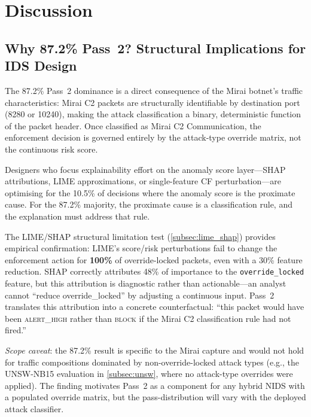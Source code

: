 \documentclass[preprint,12pt,authoryear]{elsarticle}
\begin{document}
\section{Discussion}
\label{sec:discussion}

\subsection{Why 87.2\% Pass~2? Structural Implications for IDS Design}
\label{sec:disc_pass2}

The 87.2\% Pass~2 dominance is a direct consequence of the Mirai botnet's
traffic characteristics: Mirai C2 packets are structurally identifiable by
destination port (8280 or 10240), making the attack classification a binary,
deterministic function of the packet header. Once classified as Mirai C2
Communication, the enforcement decision is governed entirely by the attack-type
override matrix, not the continuous risk score.

Designers who focus explainability effort on the anomaly score layer---SHAP
attributions, LIME approximations, or single-feature CF perturbation---are
optimising for the 10.5\% of decisions where the anomaly score is the proximate
cause. For the 87.2\% majority, the proximate cause is a classification rule,
and the explanation must address that rule.

The LIME/SHAP structural limitation test (\cref{subsec:lime_shap}) provides
empirical confirmation: LIME's score/risk perturbations fail to change
the enforcement action for \textbf{100\%} of override-locked packets, even with
a 30\% feature reduction. SHAP correctly attributes 48\% of importance to the
\texttt{override\_locked} feature, but this attribution is diagnostic rather
than actionable---an analyst cannot ``reduce override\_locked'' by adjusting
a continuous input. Pass~2 translates this attribution into a concrete
counterfactual: ``this packet would have been \textsc{alert\_high} rather than
\textsc{block} if the Mirai C2 classification rule had not fired.''

\emph{Scope caveat}: the 87.2\% result is specific to the Mirai capture and
would not hold for traffic compositions dominated by non-override-locked attack
types (e.g., the UNSW-NB15 evaluation in \cref{subsec:unsw}, where no
attack-type overrides were applied). The finding motivates Pass~2 as a
component for any hybrid NIDS with a populated override matrix, but the
pass-distribution will vary with the deployed attack classifier.
\end{document}
